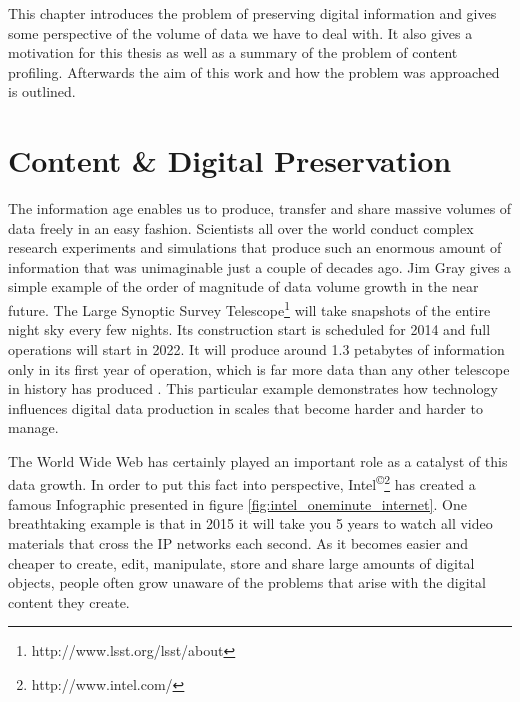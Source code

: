 This chapter introduces the problem of preserving digital information and gives some perspective of the volume of data we have to deal with. It also gives a motivation for this thesis as well as a summary of the problem of content profiling. Afterwards the aim of this work and how the problem was approached is outlined.

\section{Content \& Digital Preservation}
\label{ch:content_and_digital_preservation}
The information age enables us to produce, transfer and share massive volumes of data freely in an easy fashion. Scientists all over the world conduct complex research experiments and simulations that produce such an enormous amount of information that was unimaginable just a couple of decades ago. Jim Gray gives a simple example of the order of magnitude of data volume growth in the near future. The Large Synoptic Survey Telescope\footnote{http://www.lsst.org/lsst/about} will take snapshots of the entire night sky every few nights. Its construction start is scheduled for 2014 and full operations will start in 2022. It will produce around 1.3 petabytes of information only in its first year of operation, which is far more data than any other telescope in history has produced \cite{Gray:2009:fourthparadigm}. This particular example demonstrates how technology influences digital data production in scales that become harder and harder to manage.

The World Wide Web has certainly played an important role as a catalyst of this data growth. In order to put this fact into perspective, Intel\textsuperscript{\copyright}\footnote{http://www.intel.com/} has created a famous Infographic presented in figure \ref{fig:intel_oneminute_internet}. One breathtaking example is that in 2015 it will take you 5 years to watch all video materials that cross the IP networks each second.
As it becomes easier and cheaper to create, edit, manipulate, store and share large amounts of digital objects, people often grow unaware of the problems that arise with the digital content they create.

